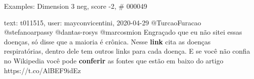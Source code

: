 \begin{frame}{Examples: Dimension 3 neg, score -2, \# 000049}
\footnotesize
\begin{alertblock}{text: t011515, user: mayconvicentini, 2020-04-29}
@TurcaoFuracao @stefanoarpassy @dantas-rosys @marcosmion Engraçado que eu não 
sitei essas doenças, só disse que a maioria é crônica. Nesse \textbf{link} cita 
as doenças respiratórias, dentro dele tem outros links para cada doença. E se 
você não confia no Wikipedia você pode \textbf{conferir} as fontes que estão em 
baixo do artigo https://t.co/AlBEF9idEz 
\end{alertblock}
\end{frame}

